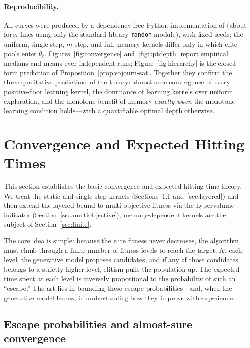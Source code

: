 \documentclass[11pt,a4paper]{article}
\begin{document}
\paragraph{Reproducibility.}

All curves were produced by a dependency-free Python implementation of
 (about forty lines using only the standard-library
\texttt{random} module), with fixed seeds; the uniform, single-step,
$m$-step, and full-memory kernels differ only in which elite pools enter
$\widehat\theta_t$.  Figures~\ref{fig:convergence} and~\ref{fig:optdepth} report empirical
medians and means over independent runs; Figure~\ref{fig:hierarchy} is the
closed-form prediction of Proposition~\ref{prop:sojourn-sat}.  Together they confirm
the three qualitative predictions of the theory: almost-sure convergence
of every positive-floor learning kernel, the dominance of learning
kernels over uniform exploration, and the monotone benefit of memory
\emph{exactly when} the monotone-learning condition holds---with a
quantifiable optimal depth otherwise.

\section{Convergence and Expected Hitting Times}
\label{sec:baseline}

This section establishes the basic convergence and expected-hitting-time
theory.  We treat the static and single-step kernels
(Sections~\ref{sec:static} and~\ref{sec:layered}) and then extend the
layered bound to multi-objective fitness via the hypervolume indicator
(Section~\ref{sec:multiobjective}); memory-dependent kernels are the
subject of Section~\ref{sec:finite}.

The core idea is simple: because the elite fitness never decreases, the
algorithm must climb through a finite number of fitness levels to reach
the target.  At each level, the generative model proposes candidates, and
if any of those candidates belongs to a strictly higher level, elitism
pulls the population up.  The expected time spent at each level is
inversely proportional to the probability of such an ``escape.''  The
art lies in bounding these escape probabilities---and, when the generative
model learns, in understanding how they improve with experience.

\subsection{Escape probabilities and almost-sure convergence}
\label{sec:static}
\end{document}
